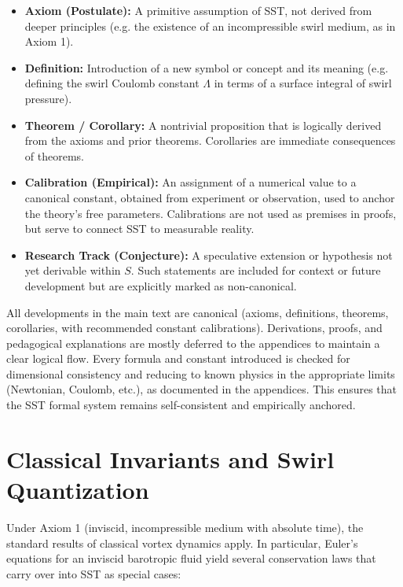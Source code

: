 \documentclass[reprint,aps,onecolumn,nofootinbib]{revtex4-2}
\begin{document}
	\begin{itemize}
		\item \textbf{Axiom (Postulate):} A primitive assumption of SST, not derived from deeper principles (e.g. the existence of an incompressible swirl medium, as in Axiom 1).
		\item \textbf{Definition:} Introduction of a new symbol or concept and its meaning (e.g. defining the swirl Coulomb constant $\Lambda$ in terms of a surface integral of swirl pressure).
		\item \textbf{Theorem / Corollary:} A nontrivial proposition that is logically derived from the axioms and prior theorems. Corollaries are immediate consequences of theorems.
		\item \textbf{Calibration (Empirical):} An assignment of a numerical value to a canonical constant, obtained from experiment or observation, used to anchor the theory’s free parameters. Calibrations are not used as premises in proofs, but serve to connect SST to measurable reality.
		\item \textbf{Research Track (Conjecture):} A speculative extension or hypothesis not yet derivable within $S$. Such statements are included for context or future development but are explicitly marked as non-canonical.
	\end{itemize}

	All developments in the main text are canonical (axioms, definitions, theorems, corollaries, with recommended constant calibrations). Derivations, proofs, and pedagogical explanations are mostly deferred to the appendices to maintain a clear logical flow. Every formula and constant introduced is checked for dimensional consistency and reducing to known physics in the appropriate limits (Newtonian, Coulomb, etc.), as documented in the appendices. This ensures that the SST formal system remains self-consistent and empirically anchored.


	\section{Classical Invariants and Swirl Quantization}
	Under Axiom 1 (inviscid, incompressible medium with absolute time), the standard results of classical vortex dynamics apply. In particular, Euler’s equations for an inviscid barotropic fluid yield several conservation laws that carry over into SST as special cases:
\end{document}

